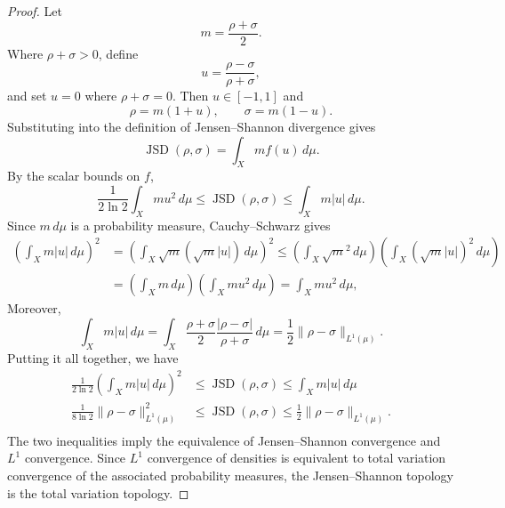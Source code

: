 \documentclass{techbrief}
\begin{document}
\begin{proof}
	Let
	\begin{equation}
		m=\frac{\rho+\sigma}{2}.
	\end{equation}
	Where $\rho+\sigma>0$, define
	\begin{equation}
		u=\frac{\rho-\sigma}{\rho+\sigma},
	\end{equation}
	and set $u=0$ where $\rho+\sigma=0$. Then $u\in[-1,1]$ and
	\begin{equation}
		\rho=m(1+u),
		\qquad
		\sigma=m(1-u).
	\end{equation}
	Substituting into the definition of Jensen--Shannon divergence gives
	\begin{equation}
		\operatorname{JSD}(\rho,\sigma)
		=
		\int_X m f(u)\,d\mu.
	\end{equation}
	By the scalar bounds on $f$,
	\begin{equation}
		\frac{1}{2\ln 2}\int_X m u^2\,d\mu
		\leq
		\operatorname{JSD}(\rho,\sigma)
		\leq
		\int_X m|u|\,d\mu.
	\end{equation}
	Since $m\,d\mu$ is a probability measure, Cauchy--Schwarz gives
	\begin{equation}
		\begin{aligned}
			\left(\int_X m|u|\,d\mu\right)^2 &= \left(\int_X \sqrt{m} \left(\sqrt{m}|u|\right)\,d\mu\right)^2
			\leq \left(\int_X \sqrt{m}^2 \,d\mu\right)
			\left(\int_X \left(\sqrt{m}|u|\right)^2\,d\mu\right) \\
			&=\left(\int_X m\,d\mu\right)
			\left(\int_X m u^2\,d\mu\right)
			=
			\int_X m u^2\,d\mu,
		\end{aligned}
	\end{equation}
	Moreover,
	\begin{equation}
		\int_X m|u|\,d\mu
		=
		\int_X \frac{\rho+\sigma}{2}
		\frac{|\rho-\sigma|}{\rho+\sigma}\,d\mu
		=
		\frac{1}{2}\|\rho-\sigma\|_{L^1(\mu)}.
	\end{equation}
	Putting it all together, we have
	\begin{equation}
		\begin{aligned}
		\frac{1}{2\ln 2}\left(\int_X m|u|\,d\mu\right)^2
&\leq
\operatorname{JSD}(\rho,\sigma)
\leq
\int_X m|u|\,d\mu \\
		\frac{1}{8\ln 2}\|\rho-\sigma\|_{L^1(\mu)}^2
&\leq
\operatorname{JSD}(\rho,\sigma)
\leq
\frac{1}{2}\|\rho-\sigma\|_{L^1(\mu)}. \\
		\end{aligned}
	\end{equation}
	The two inequalities imply the equivalence of Jensen--Shannon convergence and $L^1$ convergence. Since $L^1$ convergence of densities is equivalent to total variation convergence of the associated probability measures, the Jensen--Shannon topology is the total variation topology.
\end{proof}
\end{document}
